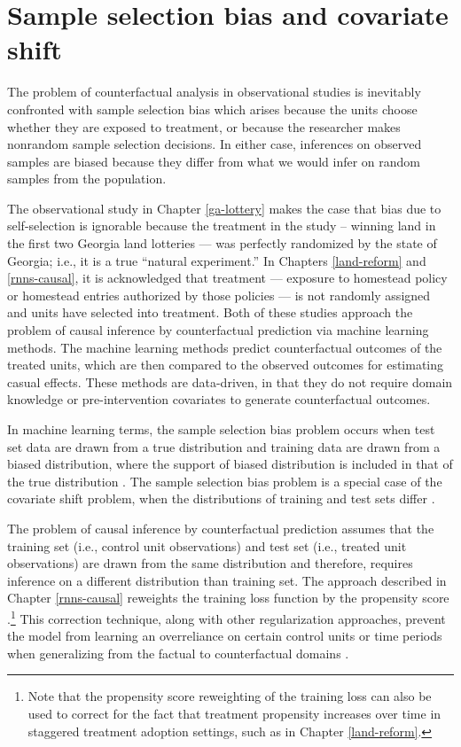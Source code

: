 \section{Sample selection bias and covariate shift}
The problem of counterfactual analysis in observational studies is inevitably confronted with sample selection bias \citep{heckman1979sample} which arises because the units choose whether they are exposed to treatment, or because the researcher makes nonrandom sample selection decisions. In either case, inferences on observed samples are biased because they differ from what we would infer on random samples from the population. 

The observational study in Chapter \ref{ga-lottery} makes the case that bias due to self-selection is ignorable because the treatment in the study -- winning land in the first two Georgia land lotteries --- was perfectly randomized by the state of Georgia; i.e., it is a true ``natural experiment.'' In Chapters \ref{land-reform} and \ref{rnns-causal}, it is acknowledged that treatment --- exposure to homestead policy or homestead entries authorized by those policies --- is not randomly assigned and units have selected into treatment. Both of these studies approach the problem of causal inference by counterfactual prediction via machine learning methods. The machine learning methods predict counterfactual outcomes of the treated units, which are then compared to the observed outcomes for estimating casual effects. These methods are data-driven, in that they do not require domain knowledge or pre-intervention covariates to generate counterfactual outcomes.  

In machine learning terms, the sample selection bias problem occurs when test set data are drawn from a true distribution and training data are drawn from a biased distribution, where the support of biased distribution is included in that of the true distribution \citep{cortes2008sample}. The sample selection bias problem is a special case of the covariate shift problem, when the distributions of training and test sets differ \citep{bickel2007discriminative}. 

The problem of causal inference by counterfactual prediction assumes that the training set (i.e., control unit observations) and test set (i.e., treated unit observations) are drawn from the same distribution and therefore, requires inference on a different distribution than training set. The approach described in Chapter \ref{rnns-causal} reweights the training loss function by the propensity score \citep{rosenbaum1983central}.\footnote{Note that the propensity score reweighting of the training loss can also be used to correct for the fact that treatment propensity increases over time in staggered treatment adoption settings, such as in Chapter \ref{land-reform}.} This correction technique, along with other regularization approaches, prevent the model from learning an overreliance on certain control units or time periods when generalizing from the factual to counterfactual domains \citep{johansson2016learning}.
	
